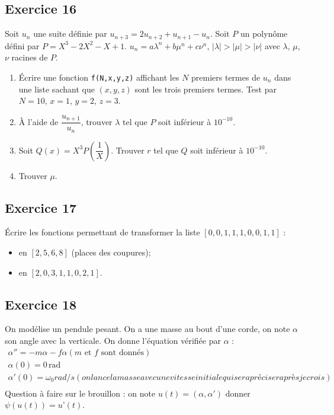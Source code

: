 \subsection*{Exercice 16}

Soit $u_n$ une suite définie par $u_{n+3}=2u_{n+2}+u_{n+1} - u_n$. Soit $P$ un polynôme défini par $P=X^3-2X^2-X+1$. $u_n=a\lambda^n+b\mu^n+ c\nu ^n$, $|\lambda|>|\mu|>|\nu|$ avec $\lambda$, $\mu$, $\nu$ racines de $P$.
\begin{enumerate}
\item Écrire une fonction \texttt{f(N,x,y,z)} affichant les $N$ premiers termes de $u_n$ dans une liste sachant que $(x,y,z)$ sont les trois premiers termes. Test par $N=10$, $x=1$, $y=2$, $z=3$.
\item À l'aide de $\dfrac{u_{n+1}}{u_n}$, trouver $\lambda$ tel que $P$ soit inférieur à $10^{-10}$.
\item Soit $Q(x)=X^3P\left(\dfrac{1}{X}\right)$. Trouver $r$ tel que $Q$ soit inférieur à $10^{-10}$.
\item Trouver $\mu$.
\end{enumerate}

\subsection*{Exercice 17}
Écrire les fonctions permettant de transformer la liste $[0,0,1,1,1,0,0,1,1]$ :
\begin{itemize}
\item en $[2,5,6,8]$ (places des coupures);
\item en $[2,0,3,1,1,0,2,1]$.
\end{itemize}

\subsection*{Exercice 18}

On modélise un pendule pesant. On a une masse au bout d’une corde, on note $\alpha$ son angle avec la verticale.
On donne l’équation vérifiée par $\alpha$ :
$$\begin{array}{c}
\alpha '' = - m \alpha  - f \alpha   (m \text{ et } f \text{ sont donnés}) \\
\alpha (0) = 0 \, \text{rad} \\
\alpha'(0) = \omega_0 rad / s (on lance la masse avec une vitesse initiale qui sera préciser après je crois)\\
\end{array}
$$
Question à faire sur le brouillon : 
on note $u(t) = (\alpha, \alpha')$ donner $\psi(u(t)) = u’(t)$.

